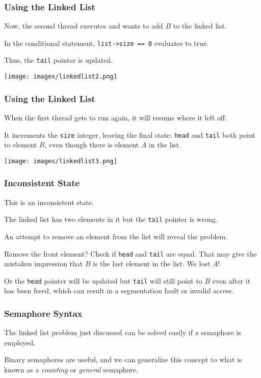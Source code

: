 \begin{frame}
	\frametitle{Using the Linked List}

	Now, the second thread executes and wants to add $B$ to the linked list.

	In the conditional statement, \texttt{list->size == 0} evaluates to true.

	Thus, the \texttt{tail} pointer is updated.

	\begin{center}
		\texttt{[image: images/linkedlist2.png]}
	\end{center}


\end{frame}

\begin{frame}
	\frametitle{Using the Linked List}

	When the first thread gets to run again, it will resume where it left off.

	It increments the \texttt{size} integer, leaving the final state: \texttt{head} and \texttt{tail} both point to element $B$, even though there is element $A$ in the list.

	\begin{center}
		\texttt{[image: images/linkedlist3.png]}
	\end{center}


\end{frame}

\begin{frame}
	\frametitle{Inconsistent State}

	This is an \alert{inconsistent state}.

	The linked list has two elements in it but the \texttt{tail} pointer is wrong.

	An attempt to remove an element from the list will reveal the problem.

	Remove the front element? Check if \texttt{head} and \texttt{tail} are equal. That may give the mistaken impression that $B$ is the last element in the list. We lost $A$!

	Or the \texttt{head} pointer will be updated but \texttt{tail} will still point to $B$ even after it has been freed, which can result in a segmentation fault or invalid access.


\end{frame}

\begin{frame}
	\frametitle{Semaphore Syntax}

	The linked list problem just discussed can be solved easily if a semaphore is employed.

	Binary semaphores are useful, and we can generalize this concept to what is known as a \textit{counting} or \textit{general} semaphore.

\end{frame}


